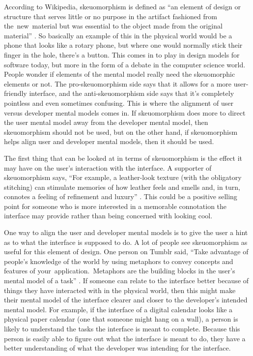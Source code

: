 \documentclass{article}
\begin{document}
According to Wikipedia, skeuomorphism is defined as ``an element of design or structure that serves little or no purpose in the artifact fashioned from the new material but was essential to the object made from the original material'' \cite{tutsplus}. So basically an example of this in the physical world would be a phone that looks like a rotary phone, but where one would normally stick their finger in the hole, there's a button. This comes in to play in design models for software today, but more in the form of a debate in the computer science world. People wonder if elements of the mental model really need the skeuomorphic elements or not. The pro-skeuomorphism side says that it allows for a more user-friendly interface, and the anti-skeuomorphism side says that it's completely pointless and even sometimes confusing. This is where the alignment of user versus developer mental models comes in. If skeuomorphism does more to direct the user mental model away from the developer mental model, then skeuomorphism should not be used, but on the other hand, if skeuomorphism helps align user and developer mental models, then it should be used.

The first thing that can be looked at in terms of skeuomorphism is the effect it may have on the user's interaction with the interface. A supporter of skeuomorphism says, ``For example, a leather-look texture (with the obligatory stitching) can stimulate memories of how leather feels and smells and, in turn, connotes a feeling of refinement and luxury'' \cite{tutsplus}. This could be a positive selling point for someone who is more interested in a memorable connotation the interface may provide rather than being concerned with looking cool.

One way to align the user and developer mental models is to give the user a hint as to what the interface is supposed to do. A lot of people see skeuomorphism as useful for this element of design. One person on Tumblr said, ``Take advantage of people's knowledge of the world by using metaphors to convey concepts and features of your application. Metaphors are the building blocks in the user's mental model of a task'' \cite{tumblr}. If someone can relate to the interface better because of things they have interacted with in the physical world, then this might make their mental model of the interface clearer and closer to the developer's intended mental model. For example, if the interface of a digital calendar looks like a physical paper calendar (one that someone might hang on a wall), a person is likely to understand the tasks the interface is meant to complete. Because this person is easily able to figure out what the interface is meant to do, they have a better understanding of what the developer was intending for the interface.
\end{document}
